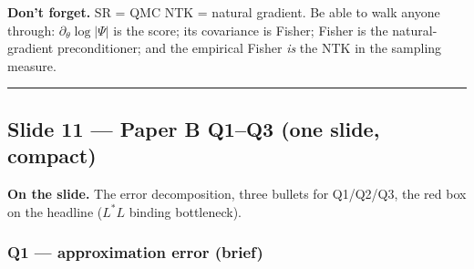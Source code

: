 \documentclass[11pt]{article}
\begin{document}
\textbf{Don't forget.} SR = QMC NTK = natural gradient. Be able to walk anyone
through: $\partial_\theta \log|\Psi|$ is the score; its covariance is
Fisher; Fisher is the natural-gradient preconditioner; and the empirical
Fisher \emph{is} the NTK in the sampling measure.

\vspace{4pt}\hrule\vspace{8pt}

\subsection*{Slide 11 --- Paper B Q1--Q3 (one slide, compact)}

\textbf{On the slide.} The error decomposition, three bullets for Q1/Q2/Q3, the
red box on the headline ($L^*L$ binding bottleneck).

\subsubsection*{Q1 --- approximation error (brief)}
\end{document}
